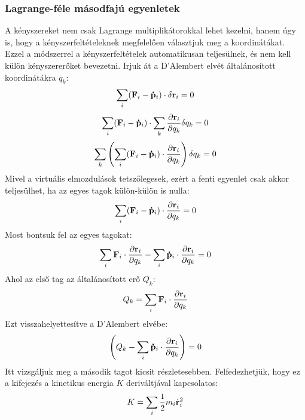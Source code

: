 \documentclass[a4paper,12pt]{article}
\begin{document}
\subsubsection*{Lagrange-féle másodfajú egyenletek}
A kényszereket nem csak Lagrange multiplikátorokkal lehet kezelni, hanem úgy is, hogy a kényszerfeltételeknek megfelelően választjuk meg a koordinátákat. Ezzel a módszerrel a kényszerfeltételek automatikusan teljesülnek, és nem kell külön kényszererőket bevezetni.
Irjuk át a D'Alembert elvét általánosított koordinátákra $q_k$:
\begin{equation}
    \sum_i (\bold{F}_i - \bold{\dot{p}}_i) \cdot \delta \bold{r}_i = 0
\end{equation}
\begin{equation}
    \sum_i (\bold{F}_i - \bold{\dot{p}}_i) \cdot \sum_k \frac{\partial \bold{r}_i}{\partial q_k} \delta q_k = 0
\end{equation}
\begin{equation}
    \sum_k \left( \sum_i (\bold{F}_i - \bold{\dot{p}}_i) \cdot \frac{\partial \bold{r}_i}{\partial q_k} \right) \delta q_k = 0
\end{equation}
Mivel a virtuális elmozdulások tetszőlegesek, ezért a fenti egyenlet csak akkor teljesülhet, ha az egyes tagok külön-külön is nulla:
\begin{equation}
    \sum_i (\bold{F}_i - \bold{\dot{p}}_i) \cdot \frac{\partial \bold{r}_i}{\partial q_k} = 0
\end{equation}
Most bontsuk fel az egyes tagokat:
\begin{equation}
    \sum_i \bold{F}_i \cdot \frac{\partial \bold{r}_i}{\partial q_k} - \sum_i \bold{\dot{p}}_i \cdot \frac{\partial \bold{r}_i}{\partial q_k} = 0
\end{equation}
Ahol az első tag az általánosított erő $Q_k$:
\begin{equation}
    Q_k = \sum_i \bold{F}_i \cdot \frac{\partial \bold{r}_i}{\partial q_k}
\end{equation}
Ezt visszahelyettesítve a D'Alembert elvébe:
\begin{equation}
    \left( Q_k - \sum_i \bold{\dot{p}}_i \cdot \frac{\partial \bold{r}_i}{\partial q_k} \right) = 0
\end{equation}
Itt vizsgáljuk meg a második tagot kicsit részletesebben. Felfedezhetjük, hogy ez a kifejezés a kinetikus energia $K$ deriváltjával kapcsolatos:
\begin{equation}
    K = \sum_i \frac{1}{2} m_i \dot{\bold{r}}_i^2
\end{equation}
\end{document}
